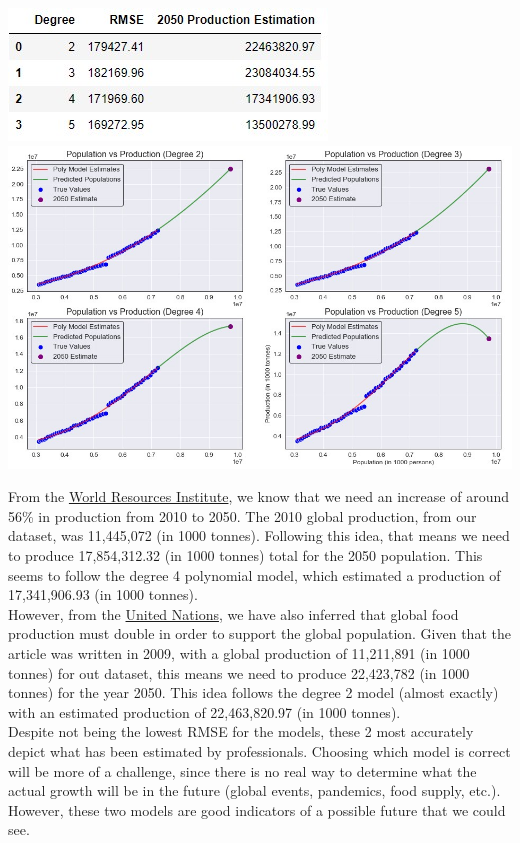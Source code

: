 \documentclass[12pt, a4paper]{article}
\begin{document}
\begin{spacing}{1.1}

	\begin{center}
	\includegraphics[scale=.85]{model_info} \\
	\includegraphics[scale=.61]{poly_model}
	\end{center}
	From the \href{https://www.wri.org/blog/2018/12/how-sustainably-feed-10-billion-people-2050-21-charts}{World Resources Institute}, we know that we need an increase of around 56\% in production from 2010 to 2050. The 2010 global production, from our dataset, was 11,445,072 (in 1000 tonnes). Following this idea, that means we need to produce 17,854,312.32 (in 1000 tonnes) total for the 2050 population. This seems to follow the degree 4 polynomial model, which estimated a production of 17,341,906.93 (in 1000 tonnes). \vspace*{2mm}\\
	However, from the \href{https://www.un.org/press/en/2009/gaef3242.doc.htm#:~:text=Food\%20production\%20must\%20double\%20by\%202050\%20to\%20meet\%20the\%20demand,a\%20panel\%20discussion\%20on\%20\%E2\%80\%9CNew}{United Nations}, we have also inferred that global food production must double in order to support the global population. Given that the article was written in 2009, with a global production of 11,211,891 (in 1000 tonnes) for out dataset, this means we need to produce 22,423,782 (in 1000 tonnes) for the year 2050. This idea follows the degree 2 model (almost exactly) with an estimated production of 22,463,820.97 (in 1000 tonnes).\vspace*{2mm}\\	
	Despite not being the lowest RMSE for the models, these 2 most accurately depict what has been estimated by professionals. Choosing which model is correct will be more of a challenge, since there is no real way to determine what the actual growth will be in the future (global events, pandemics, food supply, etc.). However, these two models are good indicators of a possible future that we could see. \newpage
	

\end{spacing}
\end{document}
